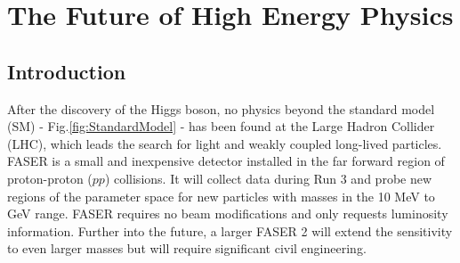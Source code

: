 
\chapter{The Future of High Energy Physics }  %

\ifpdf
    \graphicspath{{Introduction/Figs/Raster/}{Introduction/Figs/PDF/}{Introduction/Figs/}}
\else
    \graphicspath{{Introduction/Figs/Vector/}{Introduction/Figs/}}
\fi


\section{Introduction} %

After the discovery of the Higgs boson, no physics beyond the standard model (SM)  - Fig.\ref{fig:StandardModel} - has been found at the Large Hadron Collider (LHC), which leads the search for light and weakly coupled long-lived particles.
FASER is a small and inexpensive detector installed in the far forward region of proton-proton ($pp$) collisions. It will collect data during Run 3 and probe new regions of the parameter space for new particles with masses in the 10 MeV to GeV range.
FASER requires no beam modifications and only requests luminosity  information. Further into the future, a larger
 FASER 2 will extend the sensitivity to even larger masses but will require significant civil engineering.


